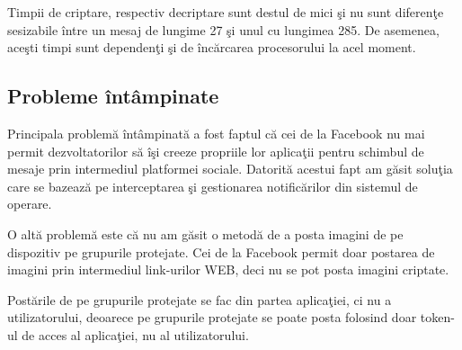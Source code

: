 Timpii de criptare, respectiv decriptare sunt destul de mici \c{s}i nu sunt diferen\c{t}e sesizabile \^{i}ntre un mesaj de lungime 27 \c{s}i unul cu lungimea 285. De asemenea, ace\c{s}ti timpi sunt dependen\c{t}i \c{s}i de \^{i}nc\u{a}rcarea procesorului la acel moment.

\subsection{Probleme \^{i}nt\^{a}mpinate}

Principala problem\u{a} \^{i}nt\^{a}mpinat\u{a} a fost faptul c\u{a} cei de la Facebook nu mai permit dezvoltatorilor s\u{a} \^{i}\c{s}i creeze propriile lor aplica\c{t}ii pentru schimbul de mesaje prin intermediul platformei sociale. Datorit\u{a} acestui fapt am g\u{a}sit solu\c{t}ia care se bazeaz\u{a} pe interceptarea \c{s}i gestionarea notific\u{a}rilor din sistemul de operare.

O alt\u{a} problem\u{a} este c\u{a} nu am g\u{a}sit o metod\u{a} de a posta imagini de pe dispozitiv pe grupurile protejate. Cei de la Facebook permit doar postarea de imagini prin intermediul link-urilor WEB, deci nu se pot posta imagini criptate.

Post\u{a}rile de pe grupurile protejate se fac din partea aplica\c{t}iei, ci nu a utilizatorului, deoarece  pe grupurile protejate se poate posta folosind doar token-ul de acces al aplica\c{t}iei, nu al utilizatorului.